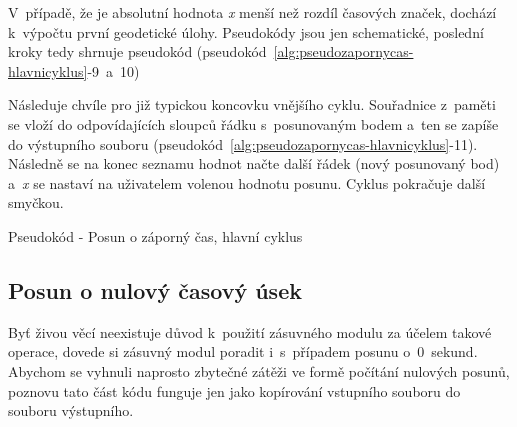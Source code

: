 V~případě, že je absolutní hodnota \textit{x} menší než rozdíl časových značek, dochází
k~výpočtu první geodetické úlohy. Pseudokódy jsou jen schematické, poslední kroky
tedy shrnuje pseudokód (pseudokód~\ref{alg:pseudozapornycas-hlavnicyklus}-9~a~10)

Následuje chvíle pro již typickou koncovku vnějšího cyklu. Souřadnice z~paměti se vloží
do odpovídajících sloupců řádku s~posunovaným bodem a~ten se zapíše do
výstupního souboru (pseudokód~\ref{alg:pseudozapornycas-hlavnicyklus}-11).
Následně se na konec seznamu hodnot načte další řádek (nový posunovaný bod) a~\textit{x}
se nastaví na uživatelem volenou hodnotu posunu. Cyklus pokračuje další smyčkou. 

\begin{algorithm}
    \caption{Pseudokód - Posun o záporný čas, hlavní cyklus}
    \label{alg:pseudozapornycas-hlavnicyklus}
    \begin{algorithmic}[1]
    \ENDIF
    \ENDFOR
\end{algorithmic}
\end{algorithm}

\begin{algorithm}                     
\begin{algorithmic} [1]
    \ENDWHILE
    \end{algorithmic}
\end{algorithm}

\subsection{Posun o nulový časový úsek}
\label{nulovycas}

Byť živou věcí neexistuje důvod k~použití zásuvného modulu za účelem takové ope\-race,
dovede si zásuvný modul poradit i~s~případem posunu o~0~sekund. Abychom se vyhnuli
naprosto zbytečné zátěži ve formě počítání nulových posunů, poznovu tato část kódu
funguje jen jako kopírování vstupního souboru do souboru výstupního. 

